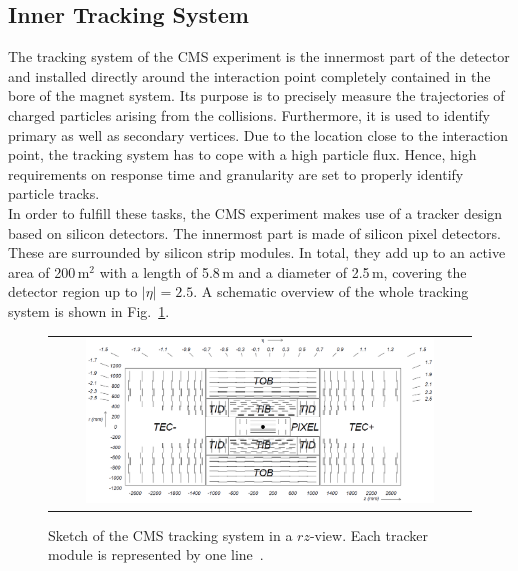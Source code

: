 \subsection{Inner Tracking System}
\label{subsec:cms_tracker}
The tracking system of the CMS experiment is the innermost part of the detector and installed directly around the interaction point completely contained in the bore of the magnet system. Its purpose is to precisely measure the trajectories of charged particles arising from the collisions. Furthermore, it is used to identify primary as well as secondary vertices. Due to the location close to the interaction point, the tracking system has to cope with a high particle flux. Hence, high requirements on response time and granularity are set to properly identify particle tracks. \\
In order to fulfill these tasks, the CMS experiment makes use of a tracker design based on silicon detectors. The innermost part is made of silicon pixel detectors. These are surrounded by silicon strip modules. In total, they add up to an active area of 200\,$\mathrm{m}^2$ with a length of 5.8\,m and a diameter of 2.5\,m, covering the detector region up to $|\eta| = 2.5$. A schematic overview of the whole tracking system is shown in Fig.~\ref{fig:CMS_tracker}. 
\begin{figure}[!tp]
  \centering
  \begin{tabular}{c}
    \includegraphics[width=0.85\textwidth]{figures/Figures_Experimental_Apparatus_Tracker.png}
  \end{tabular}
  \caption{Sketch of the CMS tracking system in a $rz$-view. Each tracker module is represented by one line~\cite{Chatrchyan:2008zzk}.}
  \label{fig:CMS_tracker}
\end{figure} 
